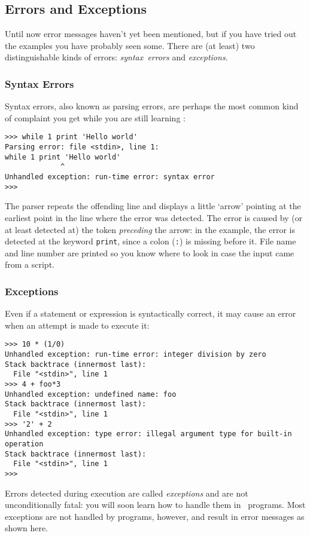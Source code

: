 \subsection{Errors and Exceptions}

Until now error messages haven't yet been mentioned, but if you have
tried out the examples you have probably seen some.
There are (at least) two distinguishable kinds of errors:
{\em syntax\ errors}
and
{\em exceptions}.

\subsubsection{Syntax Errors}

Syntax errors, also known as parsing errors, are perhaps the most common
kind of complaint you get while you are still learning \Python:
\bcode\begin{verbatim}
>>> while 1 print 'Hello world'
Parsing error: file <stdin>, line 1:
while 1 print 'Hello world'
             ^
Unhandled exception: run-time error: syntax error
>>> 
\end{verbatim}\ecode
The parser repeats the offending line and displays a little `arrow'
pointing at the earliest point in the line where the error was detected.
The error is caused by (or at least detected at) the token
{\em preceding}
the arrow: in the example, the error is detected at the keyword
{\tt print}, since a colon ({\tt :}) is missing before it.
File name and line number are printed so you know where to look in case
the input came from a script.

\subsubsection{Exceptions}

Even if a statement or expression is syntactically correct, it may cause
an error when an attempt is made to execute it:
\bcode\small\begin{verbatim}
>>> 10 * (1/0)
Unhandled exception: run-time error: integer division by zero
Stack backtrace (innermost last):
  File "<stdin>", line 1
>>> 4 + foo*3
Unhandled exception: undefined name: foo
Stack backtrace (innermost last):
  File "<stdin>", line 1
>>> '2' + 2
Unhandled exception: type error: illegal argument type for built-in operation
Stack backtrace (innermost last):
  File "<stdin>", line 1
>>> 
\end{verbatim}\ecode
Errors detected during execution are called
{\em exceptions}
and are not unconditionally fatal: you will soon learn how to handle
them in \Python\ programs.
Most exceptions are not handled by programs, however, and result
in error messages as shown here.

